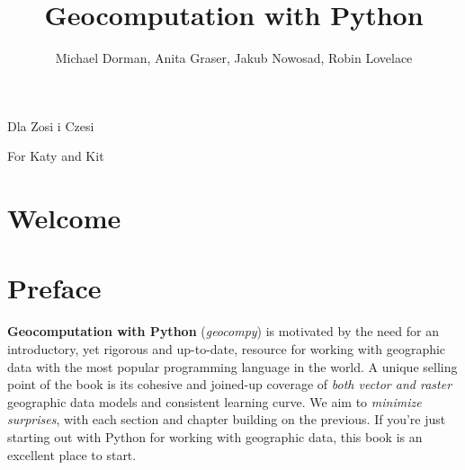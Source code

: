 \documentclass[
  letterpaper,
]{krantz}
\title{Geocomputation with Python}
\author{Michael Dorman, Anita Graser, Jakub Nowosad, Robin Lovelace}
\date{}
\renewcommand*\contentsname{Table of contents}
\newcommand\contentsname{Table of contents}
\begin{document}
\maketitle


\thispagestyle{empty}

\vspace*{\fill}


\vspace*{2cm}

\vspace*{2cm}
Dla Zosi i Czesi 

\vspace*{2cm}
For Katy and Kit


\setlength{\abovedisplayskip}{-5pt}
\setlength{\abovedisplayshortskip}{-5pt}

\renewcommand*\contentsname{Table of contents}
{
\hypersetup{linkcolor=}
\setcounter{tocdepth}{2}
\tableofcontents
}

\chapter*{Welcome}\label{welcome}



\chapter*{Preface}\label{preface}


\textbf{Geocomputation with Python} (\emph{geocompy}) is motivated by
the need for an introductory, yet rigorous and up-to-date, resource for
working with geographic data with the most popular programming language
in the world. A unique selling point of the book is its cohesive and
joined-up coverage of \emph{both vector and raster} geographic data
models and consistent learning curve. We aim to \emph{minimize
surprises}, with each section and chapter building on the previous. If
you're just starting out with Python for working with geographic data,
this book is an excellent place to start.
\end{document}
